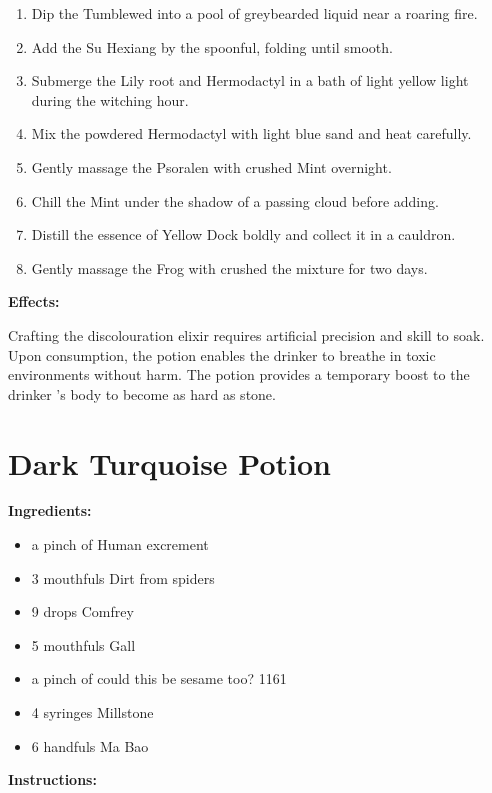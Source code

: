 \documentclass{article}
\begin{document}
\begin{enumerate}
  \item Dip the Tumblewed into a pool of greybearded liquid near a roaring fire.
  \item Add the Su Hexiang by the spoonful, folding until smooth.
  \item Submerge the Lily root and Hermodactyl in a bath of light yellow light during the witching hour.
  \item Mix the powdered Hermodactyl with light blue sand and heat carefully.
  \item Gently massage the Psoralen with crushed Mint overnight.
  \item Chill the Mint under the shadow of a passing cloud before adding.
  \item Distill the essence of Yellow Dock boldly and collect it in a cauldron.
  \item Gently massage the Frog with crushed the mixture for two days.
\end{enumerate}

\textbf{Effects:}

Crafting the discolouration elixir requires artificial precision and skill to soak. Upon consumption, the potion enables the drinker to breathe in toxic environments without harm. The potion provides a temporary boost to the drinker 's body to become as hard as stone.

\newpage
\section*{Dark Turquoise Potion}

\textbf{Ingredients:}

\begin{itemize}
  \item a pinch of Human excrement
  \item 3 mouthfuls Dirt from spiders
  \item 9 drops Comfrey
  \item 5 mouthfuls Gall
  \item a pinch of could this be sesame too? 1161
  \item 4 syringes Millstone
  \item 6 handfuls Ma Bao
\end{itemize}

\textbf{Instructions:}
\end{document}
